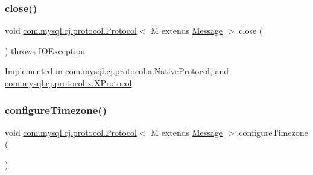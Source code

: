 \mbox{\label{interfacecom_1_1mysql_1_1cj_1_1protocol_1_1_protocol_ac38e74b2af853f10e7f9a97f6c4836f8}} 
\subsubsection{\texorpdfstring{close()}{close()}}
{\footnotesize\ttfamily void \mbox{\hyperlink{interfacecom_1_1mysql_1_1cj_1_1protocol_1_1_protocol}{com.\+mysql.\+cj.\+protocol.\+Protocol}}$<$ M extends \mbox{\hyperlink{interfacecom_1_1mysql_1_1cj_1_1protocol_1_1_message}{Message}} $>$.close (\begin{DoxyParamCaption}{ }\end{DoxyParamCaption}) throws I\+O\+Exception}



Implemented in \mbox{\hyperlink{classcom_1_1mysql_1_1cj_1_1protocol_1_1a_1_1_native_protocol_a74b35f6ae7f3feb2baeee7a845c82085}{com.\+mysql.\+cj.\+protocol.\+a.\+Native\+Protocol}}, and \mbox{\hyperlink{classcom_1_1mysql_1_1cj_1_1protocol_1_1x_1_1_x_protocol_a57f0cb65f276893aee9581111edad17d}{com.\+mysql.\+cj.\+protocol.\+x.\+X\+Protocol}}.

\mbox{\label{interfacecom_1_1mysql_1_1cj_1_1protocol_1_1_protocol_a21ceb9181ddbbf615ead4ad2e24e5544}} 
\subsubsection{\texorpdfstring{configure\+Timezone()}{configureTimezone()}}
{\footnotesize\ttfamily void \mbox{\hyperlink{interfacecom_1_1mysql_1_1cj_1_1protocol_1_1_protocol}{com.\+mysql.\+cj.\+protocol.\+Protocol}}$<$ M extends \mbox{\hyperlink{interfacecom_1_1mysql_1_1cj_1_1protocol_1_1_message}{Message}} $>$.configure\+Timezone (\begin{DoxyParamCaption}{ }\end{DoxyParamCaption})}



